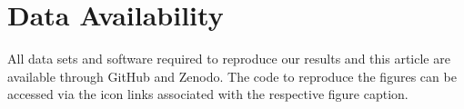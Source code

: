 \documentclass[modern]{aastex631}
\begin{document}
\section*{Data Availability}
All data sets and software required to reproduce our results and this article are available through GitHub and Zenodo.
The code to reproduce the figures can be accessed via the icon links associated with the respective figure caption.






\end{document}
